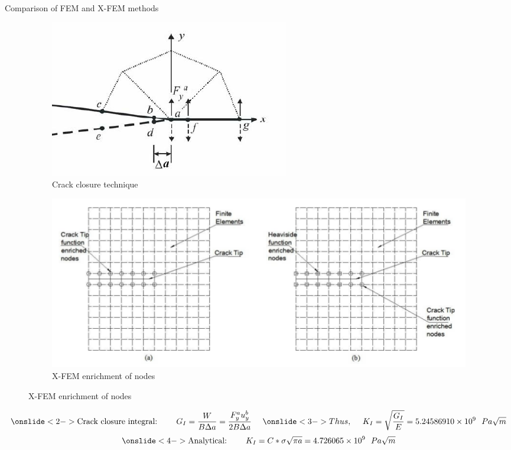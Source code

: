 \documentclass{beamer}
\begin{document}
\begin{frame}[t,fragile]{Comparison of FEM and X-FEM methods}
    \vspace{-.9cm}
    \hspace{15pt}
        \begin{figure}[H]
  \begin{subfigure}{0.45\textwidth}
    \centering
      \includegraphics[scale=.2]{crackclosure.png}
    \caption{\tiny Crack closure technique}
\end{subfigure}
        \hspace{15pt}
      \begin{subfigure}{0.45\textwidth}
    \centering
       \includegraphics[scale=.15]{k.png}
    \caption{\tiny X-FEM enrichment of nodes}
\end{subfigure}
\end{figure}
\vspace{-12pt}
    \tiny    
$$
   \onslide<2->    \text{Crack closure integral:}\ \ \ \ \ \ \ G_I=\frac{W}{B\Delta a}=\frac{F_{y}^au_{y}^b}{2B \Delta a}\ \ \ \
   \onslide<3->Thus, \ \ \ \
    K_I=\sqrt{\frac{G_I}{E}}=5.24586910\times 10^9\ \ Pa\sqrt{m}$$ $$ 
    \onslide<4->  \text{Analytical:}\ \ \ \ \ \ \ K_I=C*\sigma\sqrt{\pi a}=4.726065 \times 10^9\ \ Pa\sqrt{m}
    $$
\vspace{-10pt}
\bgroup\onslide<5->

\end{frame}
\end{document}
